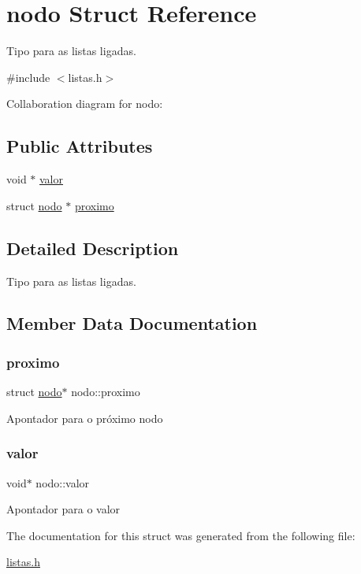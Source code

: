 \hypertarget{structnodo}{}\section{nodo Struct Reference}
\label{structnodo}


Tipo para as listas ligadas.  




{\ttfamily \#include $<$listas.\+h$>$}



Collaboration diagram for nodo\+:
\subsection*{Public Attributes}
\begin{DoxyCompactItemize}
\item 
void $\ast$ \hyperlink{structnodo_ab63adcdb83ea1fdcf4fa10f3cafc4a6a}{valor}
\item 
struct \hyperlink{structnodo}{nodo} $\ast$ \hyperlink{structnodo_aaaabdcb6641ddcdac8990402242b154a}{proximo}
\end{DoxyCompactItemize}


\subsection{Detailed Description}
Tipo para as listas ligadas. 

\subsection{Member Data Documentation}
\mbox{\label{structnodo_aaaabdcb6641ddcdac8990402242b154a}} 
\subsubsection{\texorpdfstring{proximo}{proximo}}
{\footnotesize\ttfamily struct \hyperlink{structnodo}{nodo}$\ast$ nodo\+::proximo}

Apontador para o próximo nodo \mbox{\label{structnodo_ab63adcdb83ea1fdcf4fa10f3cafc4a6a}} 
\subsubsection{\texorpdfstring{valor}{valor}}
{\footnotesize\ttfamily void$\ast$ nodo\+::valor}

Apontador para o valor 

The documentation for this struct was generated from the following file\+:\begin{DoxyCompactItemize}
\item 
\hyperlink{listas_8h}{listas.\+h}\end{DoxyCompactItemize}

